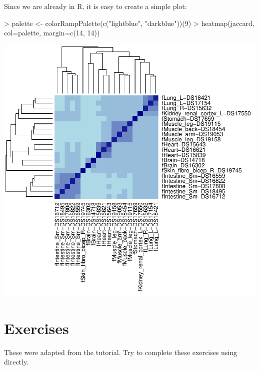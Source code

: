 \documentclass[10pt]{article}
\begin{document}
Since we are already in R, it is easy to create a simple plot:
\begin{Schunk}
\begin{Sinput}
> palette <- colorRampPalette(c("lightblue", "darkblue"))(9)
> heatmap(jaccard, col=palette, margin=c(14, 14))
\end{Sinput}
\end{Schunk}
\includegraphics{tutorial-jaccard-plot}

\section{Exercises}

These were adapted from the  tutorial. Try to
complete these exercises using \Bioconductor{} directly.
\end{document}
